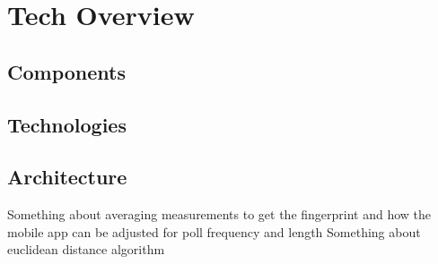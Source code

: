 \chapter{Tech Overview}
\label{tech-overview}
%

\section{Components}
%

\section{Technologies}
%

\section{Architecture}
%


Something about averaging measurements to get the fingerprint
	and how the mobile app can be adjusted for poll frequency and length
Something about euclidean distance algorithm

